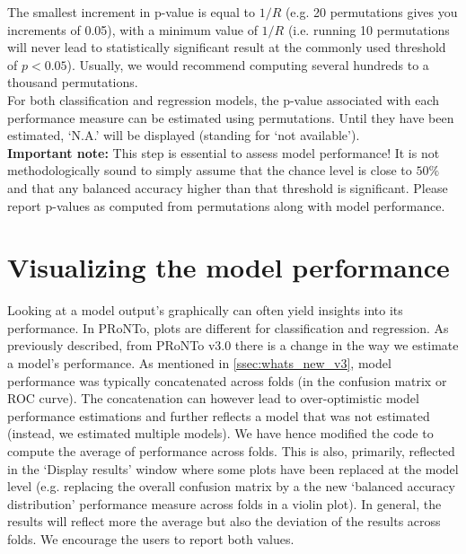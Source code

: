The smallest increment in p-value is equal to $1/R$ (e.g. 20 permutations gives you increments of 0.05), with a minimum value of $1/R$ (i.e. running 10 permutations will never lead to statistically significant result at the commonly used threshold of $p<0.05$). Usually, we would recommend computing several hundreds to a thousand permutations.
\\

For both classification and regression models, the p-value associated with each performance measure can be estimated using permutations. Until they have been estimated, `N.A.' will be displayed (standing for `not available').
\\

\textbf{Important note:} This step is essential to assess model performance! It is not methodologically sound to simply assume that the chance level is close to $50\%$ and that any balanced accuracy higher than that threshold is significant. Please report p-values as computed from permutations along with model performance.







\section{Visualizing the model performance}

Looking at a model output's graphically can often yield insights into its performance. In PRoNTo, plots are different for classification and regression. As previously described, from PRoNTo v3.0 there is a change in the way we estimate a model's performance. As mentioned in \ref{ssec:whats_new_v3}, model performance was typically concatenated across folds (in the confusion matrix or ROC curve). The concatenation can however lead to over-optimistic model performance estimations and further reflects a model that was not estimated (instead, we estimated multiple models). We have hence modified the code to compute the average of performance across folds. This is also, primarily, reflected in the `Display results' window where some plots have been replaced at the model level (e.g. replacing the overall confusion matrix by a the new `balanced accuracy distribution' performance measure across folds in a violin plot). In general, the results will reflect more the average but also the deviation of the results across folds. We encourage the users to report both values.
\\

